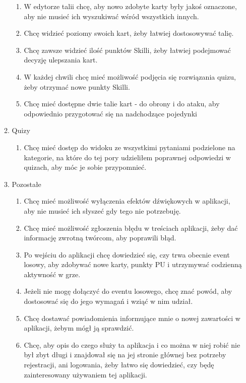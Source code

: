 \documentclass{article}
\begin{document}
\begin{tcolorbox}
\begin{enumerate}
\begin{enumerate}
\begin{enumerate}
                            \item W edytorze talii chcę, aby nowo zdobyte karty były jakoś oznaczone, aby nie musieć ich wyszukiwać wśród wszystkich innych.
                            \item Chcę widzieć poziomy swoich kart, żeby łatwiej dostosowywać talię.
                            \item Chcę zawsze widzieć ilość punktów Skilli, żeby łatwiej podejmować decyzję ulepszania kart.
                            \item W każdej chwili chcę mieć możliwość podjęcia się rozwiązania quizu, żeby otrzymać nowe punkty Skilli.
                            \item Chcę mieć dostępne dwie talie kart - do obrony i do ataku, aby odpowiednio przygotować się na nadchodzące pojedynki
                        \end{enumerate}
                  \item Quizy
                        \begin{enumerate}
                            \item Chcę mieć dostęp do widoku ze wszystkimi pytaniami podzielone na kategorie, na które do tej pory udzieliłem poprawnej odpowiedzi w quizach, aby móc je sobie przypomnieć.
                        \end{enumerate}
                  \item Pozostałe
                        \begin{enumerate}
                            \item  Chcę mieć możliwość wyłączenia efektów dźwiękowych w aplikacji, aby nie musieć ich słyszeć gdy tego nie potrzebuję.
                            \item Chcę mieć możliwość zgłoszenia błędu w treściach aplikacji, żeby dać informację zwrotną twórcom, aby poprawili błąd.
                            \item Po wejściu do aplikacji chcę dowiedzieć się, czy trwa obecnie event losowy, aby zdobywać nowe karty, punkty PU i utrzymywać codzienną aktywność w grze.
                            \item Jeżeli nie mogę dołączyć do eventu losowego, chcę znać powód, aby dostosować się do jego wymagań i wziąć w nim udział.
                            \item Chcę dostawać powiadomienia informujące mnie o nowej zawartości w aplikacji, żebym mógł ją sprawdzić.
                            \item Chcę, aby opis do czego służy ta aplikacja i co można w niej robić nie był zbyt długi i znajdował się na jej stronie głównej bez potrzeby rejestracji, ani logowania, żeby łatwo się dowiedzieć, czy będę zainteresowany używaniem tej aplikacji.

\end{enumerate}
\end{enumerate}
\end{enumerate}
\end{tcolorbox}
\end{document}

